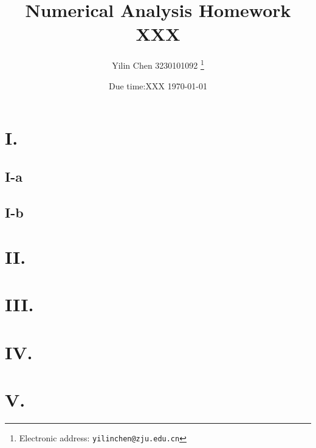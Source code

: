 \documentclass[a4paper]{article}
\begin{document}
\title{Numerical Analysis Homework XXX}

\author{Yilin Chen 3230101092
  \thanks{Electronic address: \texttt{yilinchen@zju.edu.cn}}}


\date{Due time:XXX \today}

\maketitle






\section*{I. }

\subsection*{I-a}



\subsection*{I-b}



\section*{II. }


\section*{III. }


\section*{IV. }


\section*{V. }
\end{document}

